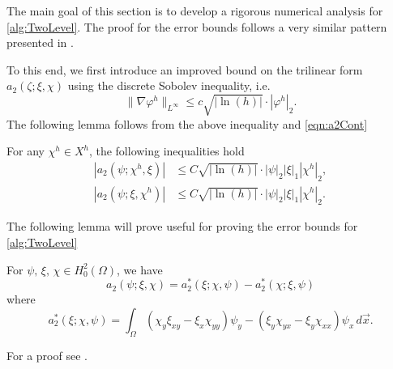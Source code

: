 The main goal of this section is to develop a rigorous numerical analysis for
\autoref{alg:TwoLevel}. The proof for the error bounds follows a very similar pattern presented in
\cite{Fairag98}. 

To this end, we first introduce an improved bound on the trilinear form $a_2(\zeta; \xi, \chi)$ using
the discrete Sobolev inequality, i.e.
\begin{equation*}
  \|\nabla \varphi^h\|_{L^{\infty}} \le c \sqrt{|\ln(h)|}\cdot |\varphi^h|_2.
\end{equation*}
The following lemma follows from the above inequality and \eqref{eqn:a2Cont} %
\begin{lemma} \label{lma:bImproved}
  For any $\chi^h\in X^h$, the following inequalities hold
  \begin{align*}
    |a_2(\psi;\chi^h,\xi)| &\le C\sqrt{|\ln(h)|} \cdot |\psi|_2 |\xi|_1 |\chi^h|_2, \\
    |a_2(\psi;\xi,\chi^h)| &\le C\sqrt{|\ln(h)|} \cdot |\psi|_2 |\xi|_1 |\chi^h|_2.
  \end{align*}
\end{lemma}
The following lemma will prove useful for proving the error bounds for \autoref{alg:TwoLevel}
\begin{lemma} \label{lma:trilinear}
  For $\psi,\,\xi,\,\chi\in H^2_0(\Omega)$, we have
  \begin{equation}
    a_2(\psi; \xi, \chi) = a_2^*(\xi; \chi, \psi) - a_2^*(\chi; \xi, \psi)
    \label{eqn:eqn:trilinear}
  \end{equation}
  where 
  \begin{equation}
    a_2^*(\xi; \chi, \psi) = \int_{\Omega}\! (\chi_y\xi_{xy}-\xi_x\chi_{yy}) \psi_y -
    (\xi_y\chi_{yx}-\xi_y\chi_{xx}) \psi_x \,d\vec{x}.
    \label{eqn:trilinear}
  \end{equation}
\end{lemma}
For a proof see \cite{Fairag98}.

